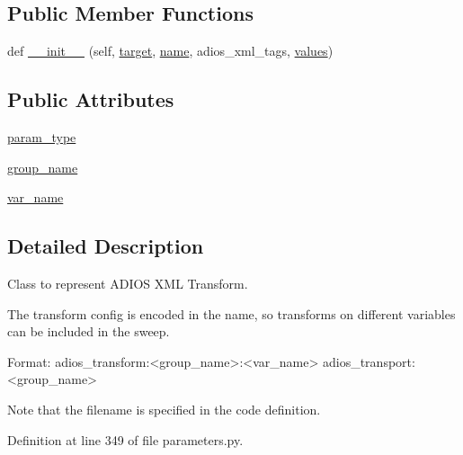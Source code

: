 \subsection*{Public Member Functions}
\begin{DoxyCompactItemize}
\item 
def \hyperlink{classcodar_1_1cheetah_1_1parameters_1_1_param_adios_x_m_l_adf9f325576073f42a6e6258403d2632a}{\+\_\+\+\_\+init\+\_\+\+\_\+} (self, \hyperlink{classcodar_1_1cheetah_1_1parameters_1_1_param_a5603d43a20cfc6447c3718406ce0669e}{target}, \hyperlink{classcodar_1_1cheetah_1_1parameters_1_1_param_ac9982d62cd18a368a3fbc26541e14209}{name}, adios\+\_\+xml\+\_\+tags, \hyperlink{classcodar_1_1cheetah_1_1parameters_1_1_param_aefcc82658f511bddd6605e6ac6e74fbf}{values})
\end{DoxyCompactItemize}
\subsection*{Public Attributes}
\begin{DoxyCompactItemize}
\item 
\hyperlink{classcodar_1_1cheetah_1_1parameters_1_1_param_adios_x_m_l_afde8e863f3fb2178723d8f66d6517da2}{param\+\_\+type}
\item 
\hyperlink{classcodar_1_1cheetah_1_1parameters_1_1_param_adios_x_m_l_a248f6d5289be4cad0d6874ece711189b}{group\+\_\+name}
\item 
\hyperlink{classcodar_1_1cheetah_1_1parameters_1_1_param_adios_x_m_l_a8b796c2d1149b202122fcf13a8d31660}{var\+\_\+name}
\end{DoxyCompactItemize}


\subsection{Detailed Description}
\begin{DoxyVerb}Class to represent ADIOS XML Transform.

The transform config is encoded in the name, so transforms on different
variables can be included in the sweep.

Format:
    adios_transform:<group_name>:<var_name>
    adios_transport:<group_name>

Note that the filename is specified in the code definition.
\end{DoxyVerb}
 

Definition at line 349 of file parameters.\+py.



